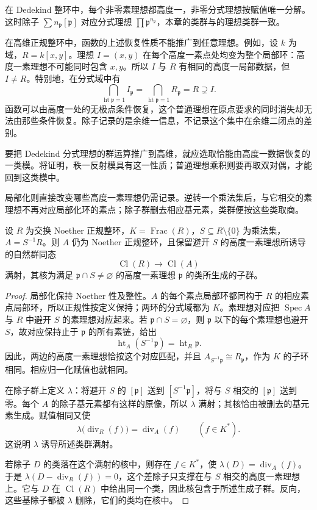 在 Dedekind 整环中，每个非零素理想都高度一，非零分式理想按赋值唯一分解。这时除子 \(\sum n_{\mathfrak p}[\mathfrak p]\) 对应分式理想 \(\prod\mathfrak p^{n_{\mathfrak p}}\)，本章的类群与的理想类群一致。

\ProseParagraphBreak
在高维正规整环中，函数的上述恢复性质不能推广到任意理想。例如，设 \(k\) 为域，\(R=k[x,y]\)。理想 \(I=(x,y)\) 在每个高度一素点处均变为整个局部环：高度一素理想不可能同时包含 \(x,y\)。所以 \(I\) 与 \(R\) 有相同的高度一局部数据，但 \(I\ne R\)。特别地，在分式域中有
\[
	\bigcap_{\operatorname{ht}\mathfrak p=1}I_{\mathfrak p} =\bigcap_{\operatorname{ht}\mathfrak p=1}R_{\mathfrak p} =R\supsetneq I.
\]
函数可以由高度一处的无极点条件恢复，这个普通理想在原点要求的同时消失却无法由那些条件恢复。除子记录的是余维一信息，不记录这个集中在余维二闭点的差别。

\ProseParagraphBreak
要把 Dedekind 分式理想的群运算推广到高维，就应选取恰能由高度一数据恢复的一类模。将证明，秩一反射模具有这一性质；普通理想乘积则要再取双对偶，才能回到这类模中。

\ProseParagraphBreak
局部化则直接改变哪些高度一素理想仍需记录。逆转一个乘法集后，与它相交的素理想不再对应局部化环的素点；除子群删去相应基元素，类群便按这些类取商。

\begin{proposition}\label{b3:prop:class-group-localization}
	设 \(R\) 为交换 Noether 正规整环，\(K=\operatorname{Frac}(R)\)，\(S\subseteq R\setminus\{0\}\) 为乘法集，\(A=S^{-1}R\)。则 \(A\) 仍为 Noether 正规整环，且保留避开 \(S\) 的高度一素理想所诱导的自然群同态
	\[
		\operatorname{Cl}(R)\longrightarrow\operatorname{Cl}(A)
	\]
	满射，其核为满足 \(\mathfrak p\cap S\ne\varnothing\) 的高度一素理想 \(\mathfrak p\) 的类所生成的子群。
\end{proposition}
\begin{proof}
	局部化保持 Noether 性及整性。\(A\) 的每个素点局部环都同构于 \(R\) 的相应素点局部环，所以正规性按定义保持；两环的分式域都为 \(K\)。素理想对应把 \(\operatorname{Spec}A\) 与 \(R\) 中避开 \(S\) 的素理想对应起来。若 \(\mathfrak p\cap S=\varnothing\)，则 \(\mathfrak p\) 以下的每个素理想也避开 \(S\)，故对应保持止于 \(\mathfrak p\) 的所有素链，给出
	\[
		\operatorname{ht}_A(S^{-1}\mathfrak p)=\operatorname{ht}_R\mathfrak p.
	\]
	因此，两边的高度一素理想恰按这个对应匹配，并且 \(A_{S^{-1}\mathfrak p}\cong R_{\mathfrak p}\)，作为 \(K\) 的子环相同。相应归一化赋值也就相同。

	在除子群上定义 \(\lambda\)：将避开 \(S\) 的 \([\mathfrak p]\) 送到 \([S^{-1}\mathfrak p]\)，将与 \(S\) 相交的 \([\mathfrak p]\) 送到零。每个 \(A\) 的除子基元素都有这样的原像，所以 \(\lambda\) 满射；其核恰由被删去的基元素生成。赋值相同又使
	\[
		\lambda\bigl(\operatorname{div}_R(f)\bigr) =\operatorname{div}_A(f)\qquad(f\in K^*).
	\]
	这说明 \(\lambda\) 诱导所述类群满射。

	若除子 \(D\) 的类落在这个满射的核中，则存在 \(f\in K^*\)，使 \(\lambda(D)=\operatorname{div}_A(f)\)。于是 \(\lambda(D-\operatorname{div}_R(f))=0\)，这个差除子只支撑在与 \(S\) 相交的高度一素理想上。它与 \(D\) 在 \(\operatorname{Cl}(R)\) 中给出同一个类，因此核包含于所述生成子群。反向，这些基除子都被 \(\lambda\) 删除，它们的类均在核中。
\end{proof}
